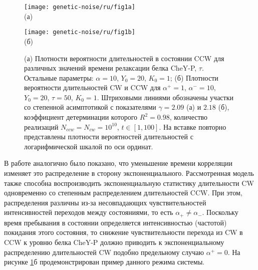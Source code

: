 \begin{figure}[ht]
    \begin{minipage}[b][][b]{0.49\linewidth}\centering
        \texttt{[image: genetic-noise/ru/fig1a]} \\ (а)
    \end{minipage}
    \hfill
    \begin{minipage}[b][][b]{0.49\linewidth}\centering
        \texttt{[image: genetic-noise/ru/fig1b]} \\ (б)
    \end{minipage}
    \caption{
        (а) Плотности вероятности длительностей в состоянии CCW для различных значений времени релаксации белка CheY-P, $\tau$. Остальные параметры: $\alpha = 10$, $Y_0 = 20$, $K_0 = 1$; (б) Плотности вероятности длительностей CW и CCW для $\alpha^+ = 1$, $\alpha^- = 10$, $Y_0 = 20$, $\tau = 50$, $K_0 = 1$. Штриховыми линиями обозначены участки со степенной асимптотикой с показателями $\gamma = 2.09$ (а) и $2.18$ (б), коэффициент детерминации которого $R^2 = 0.98$, количество реализаций $N_{ccw} = N_{cw} = 10^{10}$, $t \in [1, 100]$. На вставке повторно представлены плотности вероятностей длительностей с логарифмической шкалой по оси ординат.
    }
    \label{fig:duration-pdf}
\end{figure}


В работе \cite{tu_how_2005} аналогично было показано, что уменьшение времени корреляции изменяет это распределение в сторону экспоненциального. Рассмотренная модель также способна воспроизводить экспоненциальную статистику длительности CW одновременно со степенным распределением длительностей CCW. При этом, распределения различны из-за несовпадающих чувствительностей интенсивностей переходов между состояниями, то есть $\alpha_+ \neq \alpha_-$. Поскольку время пребывания в состоянии определяется интенсивностью (частотой) покидания этого состояния, то снижение чувствительности перехода из CW в CCW к уровню белка CheY-P должно приводить к экспоненциальному распределению длительностей CW подобно предельному случаю $\alpha^+ = 0$. На рисунке \cref{fig:duration-pdf}б продемонстрирован пример данного режима системы.

